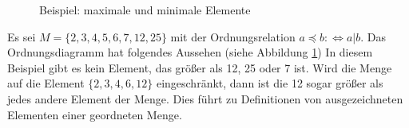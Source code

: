 \begin{Unit}[Beispiel]

\begin{figure}[htbp]
\begin{center}
  \setlength{\unitlength}{1.0cm}
  \caption{Beispiel: maximale und minimale Elemente}
  \label{abb:rel:Beispiel: maximale und minimale Elemente}
\end{center}
\end{figure}

\label{bsp:Relationen:Ordnungsrelation}
  Es sei $M = \{2, 3, 4, 5, 6, 7, 12, 25\}$ mit der Ordnungsrelation $a \preceq 
  b :\Leftrightarrow a|b$. Das Ordnungsdiagramm hat folgendes Aussehen (siehe 
  Abbildung \ref{abb:rel:Beispiel: maximale und minimale Elemente}) In diesem 
  Beispiel gibt es kein Element, das größer als 12, 25 oder 7 ist. Wird die 
  Menge auf die Element $\{2, 3, 4, 6, 12\}$ eingeschränkt, dann ist die 12 
  sogar größer als jedes andere Element der Menge. Dies führt zu Definitionen 
  von ausgezeichneten Elementen einer geordneten Menge.
\end{Unit}

